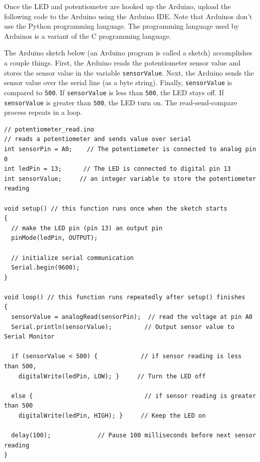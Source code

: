 \documentclass{book}
\begin{document}
    
        Once the LED and potentiometer are hooked up the Arduino, upload the
following code to the Arduino using the Arduino IDE. Note that Arduinos
don't use the Python programming language. The programming language used
by Arduinos is a variant of the C programming language.

The Arduino sketch below (an Arduino program is called a sketch)
accomplishes a couple things. First, the Arduino reads the potentiometer
sensor value and stores the sensor value in the variable
\lstinline!sensorValue!. Next, the Arduino sends the sensor value over
the serial line (as a byte string). Finally, \lstinline!sensorValue! is
compared to \lstinline!500!. If \lstinline!sensorValue! is less than
\lstinline!500!, the LED stays off. If \lstinline!sensorValue! is
greater than \lstinline!500!, the LED turn on. The read-send-compare
process repeats in a loop.
    




    
        \begin{lstlisting}
// potentiometer_read.ino
// reads a potentiometer and sends value over serial
int sensorPin = A0;    // The potentiometer is connected to analog pin 0                  
int ledPin = 13;      // The LED is connected to digital pin 13
int sensorValue;     // an integer variable to store the potentiometer reading

void setup() // this function runs once when the sketch starts
{
  // make the LED pin (pin 13) an output pin
  pinMode(ledPin, OUTPUT);

  // initialize serial communication
  Serial.begin(9600);
}

void loop() // this function runs repeatedly after setup() finishes
{
  sensorValue = analogRead(sensorPin);  // read the voltage at pin A0   
  Serial.println(sensorValue);         // Output sensor value to Serial Monitor
  
  if (sensorValue < 500) {            // if sensor reading is less than 500,
    digitalWrite(ledPin, LOW); }     // Turn the LED off
  
  else {                               // if sensor reading is greater than 500
    digitalWrite(ledPin, HIGH); }     // Keep the LED on
  
  delay(100);             // Pause 100 milliseconds before next sensor reading
}
\end{lstlisting}
    
\end{document}
